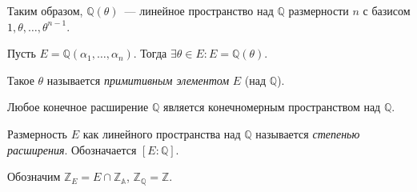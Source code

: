 Таким образом, $\mathbb{Q}(\theta)$ — линейное пространство над $\mathbb{Q}$ размерности $n$ с базисом $1, \theta, \ldots, \theta^{n - 1}$.

\begin{theorem} \label{l11_th4}
	Пусть $E = \mathbb{Q}(\alpha_1, \ldots, \alpha_n)$. Тогда $\exists \theta \in E: E = \mathbb{Q}(\theta)$.
\end{theorem}

\begin{definition}
	Такое $\theta$ называется \textit{примитивным элементом} $E$ (над $\mathbb{Q}$).
\end{definition}

\begin{corollary}
	Любое конечное расширение $\mathbb{Q}$ является конечномерным пространством над $\mathbb{Q}$.
\end{corollary}

\begin{definition}
	Размерность $E$ как линейного пространства над $\mathbb{Q}$ называется \textit{степенью расширения}.
	Обозначается $[E \colon \mathbb{Q}]$.
\end{definition}

Обозначим $\mathbb{Z}_E = E \cap \mathbb{Z_A}$, $\mathbb{Z_Q} = \mathbb{Z}$.